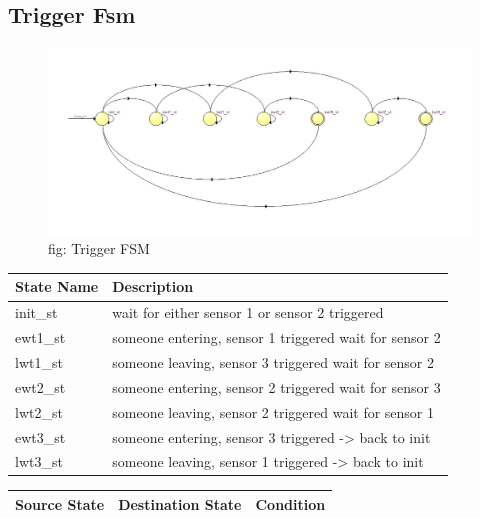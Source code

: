 \documentclass[12pt,a4 paper] {report}
\begin{document}
\subsection{Trigger Fsm}
\begin{figure}[h]
	\centering	
	\includegraphics[scale=0.4]{../png/Trigger.png}
	\newline
	fig: Trigger FSM\\
\end{figure}
\begin{center}
 \begin{tabular}{| p{4cm} | p{7cm} |}
	 \hline
	 \textbf{State Name} & \textbf{Description} \\
	 \hline
	 init\_st & wait for either sensor 1 or sensor 2 triggered \\
	 \hline
	 ewt1\_st & someone entering, sensor 1 triggered wait for sensor 2 \\
	 \hline
	 lwt1\_st & someone leaving, sensor 3 triggered wait for sensor 2 \\
	 \hline
	 ewt2\_st & someone entering, sensor 2 triggered wait for sensor 3 \\
	 \hline
	 lwt2\_st & someone leaving, sensor 2 triggered wait for sensor 1 \\
	 \hline
	 ewt3\_st & someone entering, sensor 3 triggered -> back to init \\
	 \hline
	 lwt3\_st & someone leaving, sensor 1 triggered -> back to init \\
	 \hline
 \end{tabular}
\end{center}
\begin{center}
	\begin{tabular}{| p{2cm} | p{2cm} | p{11cm} |}
		\hline
		Source State& Destination State & Condition \\
		\hline	
		
			
	\end{tabular}	
\end{center}
\end{document}
